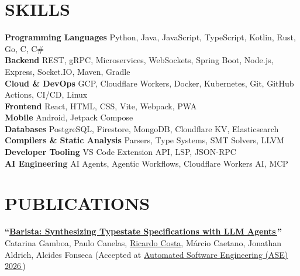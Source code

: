 \documentclass[letterpaper,11pt]{article}
\let\oldhref\href
\renewcommand{\href}[2]{\oldhref{#1}{#2\,{\color{dark-grey}\scriptsize\faLink}}}
\begin{document}
\section{SKILLS}
 \begin{itemize}[leftmargin=0in, label={}]
    \small{\item{
     \textbf{Programming Languages} \textbar{} {Python, Java, JavaScript, TypeScript, Kotlin, Rust, Go, C, C\#}\vspace{2pt} \\
     \textbf{Backend} \textbar{} {REST, gRPC, Microservices, WebSockets, Spring Boot, Node.js, Express, Socket.IO, Maven, Gradle}\vspace{2pt} \\
     \textbf{Cloud \& DevOps} \textbar{} {GCP, Cloudflare Workers, Docker, Kubernetes, Git, GitHub Actions, CI/CD, Linux}\vspace{2pt} \\
     \textbf{Frontend} \textbar{} {React, HTML, CSS, Vite, Webpack, PWA}\vspace{2pt} \\
     \textbf{Mobile} \textbar{} {Android, Jetpack Compose}\vspace{2pt} \\
     \textbf{Databases} \textbar{} {PostgreSQL, Firestore, MongoDB, Cloudflare KV, Elasticsearch}\vspace{2pt} \\
     \textbf{Compilers \& Static Analysis} \textbar{} {Parsers, Type Systems, SMT Solvers, LLVM}\vspace{2pt} \\
     \textbf{Developer Tooling} \textbar{} {VS Code Extension API, LSP, JSON-RPC}\vspace{2pt} \\
     \textbf{AI Engineering} \textbar{} {AI Agents, Agentic Workflows, Cloudflare Workers AI, MCP}
    }}
\end{itemize}

\section{PUBLICATIONS}
 \begin{itemize}[leftmargin=0in, label={}]
    \small{\item{
      \textbf{``\href{https://rcosta358.github.io/barista-ase-26.pdf}{Barista: Synthesizing Typestate Specifications with LLM Agents}''} \textbar{} Catarina Gamboa, Paulo Canelas, \underline{Ricardo Costa}, Márcio Caetano, Jonathan Aldrich, Alcides Fonseca (Accepted at \href{https://conf.researchr.org/home/ase-2026}{Automated Software Engineering (ASE) 2026})
    }}
\end{itemize}
\end{document}

